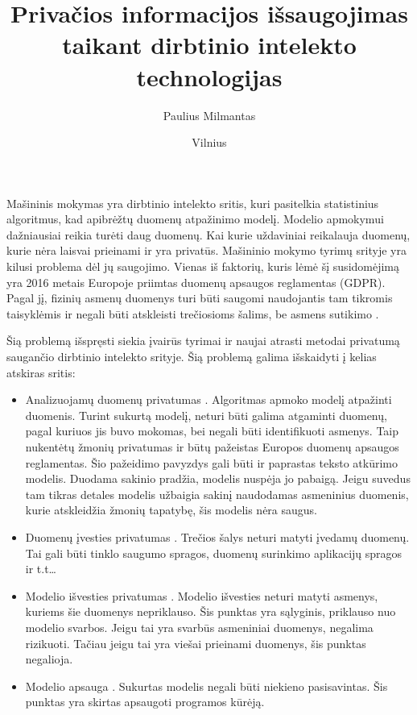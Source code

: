 \documentclass{VUMIFInfBakalaurinis}
\title{Privačios informacijos išsaugojimas taikant dirbtinio intelekto technologijas}
\author{Paulius Milmantas}
\date{Vilnius \\ \the\year}
\begin{document}
\maketitle

\tableofcontents

	\par Mašininis mokymas yra dirbtinio intelekto sritis, kuri pasitelkia statistinius algoritmus, kad apibrėžtų duomenų atpažinimo modelį. Modelio apmokymui dažniausiai reikia turėti daug duomenų. Kai kurie uždaviniai reikalauja duomenų, kurie nėra laisvai prieinami ir yra privatūs. Mašininio mokymo tyrimų srityje yra kilusi problema dėl jų saugojimo. Vienas iš faktorių, kuris lėmė šį susidomėjimą yra 2016 metais Europoje priimtas duomenų apsaugos reglamentas (GDPR). Pagal jį, fizinių asmenų duomenys turi būti saugomi naudojantis tam tikromis taisyklėmis ir negali būti atskleisti trečiosioms šalims, be asmens sutikimo \cite{1}.
	\par Šią problemą išspręsti siekia įvairūs tyrimai ir naujai atrasti metodai privatumą saugančio dirbtinio intelekto srityje. Šią problemą galima išskaidyti į kelias atskiras sritis:
\begin{itemize}
    \item Analizuojamų duomenų privatumas \cite{2}. Algoritmas apmoko modelį atpažinti duomenis. Turint sukurtą modelį, neturi būti galima atgaminti duomenų, pagal kuriuos jis buvo mokomas, bei negali būti identifikuoti asmenys. Taip nukentėtų žmonių privatumas ir būtų pažeistas Europos duomenų apsaugos reglamentas. Šio pažeidimo pavyzdys gali būti ir paprastas teksto atkūrimo modelis. Duodama sakinio pradžia, modelis nuspėja jo pabaigą. Jeigu suvedus tam tikras detales modelis užbaigia sakinį naudodamas asmeninius duomenis, kurie atskleidžia žmonių tapatybę, šis modelis nėra saugus.
    \item Duomenų įvesties privatumas \cite{2}. Trečios šalys neturi matyti įvedamų duomenų. Tai gali būti tinklo saugumo spragos, duomenų surinkimo aplikacijų spragos ir t.t…
    \item Modelio išvesties privatumas \cite{2}. Modelio išvesties neturi matyti asmenys, kuriems šie duomenys nepriklauso. Šis punktas yra sąlyginis, priklauso nuo modelio svarbos. Jeigu tai yra svarbūs asmeniniai duomenys, negalima rizikuoti. Tačiau jeigu tai yra viešai prieinami duomenys, šis punktas negalioja.
    \item Modelio apsauga \cite{2}. Sukurtas modelis negali būti niekieno pasisavintas. Šis punktas yra skirtas apsaugoti programos kūrėją.
\end{itemize}
\end{document}
